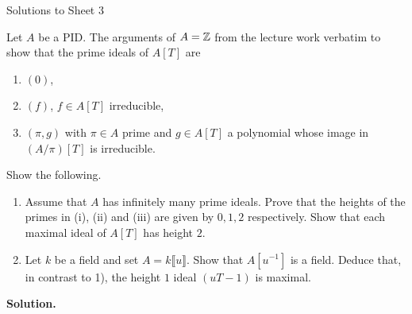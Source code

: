 \documentclass[a4paper,11pt]{article}
\begin{document}
\begin{center}
    \huge{Solutions to Sheet 3}
\end{center}

Let $A$ be a PID. The arguments of $A = \mathbb{Z}$ from the lecture work 
verbatim to show that the prime ideals of $A[T]$ are 
\begin{enumerate}
    \item $(0)$,
    \item $(f)$, $f \in A[T]$ irreducible,
    \item $(\pi, g)$ with $\pi \in A$ prime and $g \in A[T]$ a polynomial whose
        image in $(A/\pi)[T]$ is irreducible.
\end{enumerate}
Show the following.
\begin{enumerate}
    \item Assume that $A$ has infinitely many prime ideals. Prove that the
        heights of the primes in (i), (ii) and (iii) are given by 
        $0,1,2$ respectively. Show that each maximal ideal of $A[T]$ has height $2$. 
    \item Let $k$ be a field and set $A = k\llbracket u \rrbracket$. Show that 
        $A[u^{-1}]$ is a field. Deduce that, in contrast to 1), the height $1$
        ideal $(uT - 1)$ is maximal. 
\end{enumerate}
\textbf{Solution.}
\end{document}
